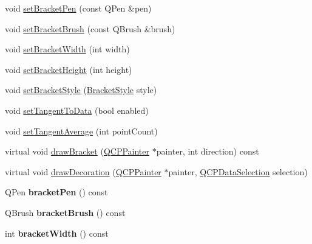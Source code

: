 \begin{DoxyCompactItemize}
\item 
void \hyperlink{class_q_c_p_selection_decorator_bracket_ac0e392a6097990f8aa978932a8fa05d6}{set\+Bracket\+Pen} (const Q\+Pen \&pen)
\item 
void \hyperlink{class_q_c_p_selection_decorator_bracket_a2f4ea0bfb0ea980252b76dd349dd53aa}{set\+Bracket\+Brush} (const Q\+Brush \&brush)
\item 
void \hyperlink{class_q_c_p_selection_decorator_bracket_a291b59cab98ce93a0a3c85963fe10f5e}{set\+Bracket\+Width} (int width)
\item 
void \hyperlink{class_q_c_p_selection_decorator_bracket_aed773ad737201cca40efc6fe451acad8}{set\+Bracket\+Height} (int height)
\item 
void \hyperlink{class_q_c_p_selection_decorator_bracket_a04507697438f6ad8cc2aeea5422dcbe5}{set\+Bracket\+Style} (\hyperlink{class_q_c_p_selection_decorator_bracket_aa6d18517ec0553575bbef0de4252336e}{Bracket\+Style} style)
\item 
void \hyperlink{class_q_c_p_selection_decorator_bracket_a93bc6086e53a5e40a08641a7b2e2cdd5}{set\+Tangent\+To\+Data} (bool enabled)
\item 
void \hyperlink{class_q_c_p_selection_decorator_bracket_adb2d0876f25a77c88042b70818f1d6e4}{set\+Tangent\+Average} (int point\+Count)
\item 
virtual void \hyperlink{class_q_c_p_selection_decorator_bracket_a8153966498e2a8d4c11c681e06d7d692}{draw\+Bracket} (\hyperlink{class_q_c_p_painter}{Q\+C\+P\+Painter} $\ast$painter, int direction) const 
\item 
virtual void \hyperlink{class_q_c_p_selection_decorator_bracket_a1ceb893063ea3d7197a24098018f4bfb}{draw\+Decoration} (\hyperlink{class_q_c_p_painter}{Q\+C\+P\+Painter} $\ast$painter, \hyperlink{class_q_c_p_data_selection}{Q\+C\+P\+Data\+Selection} selection)
\item 
Q\+Pen {\bfseries bracket\+Pen} () const \hypertarget{class_q_c_p_selection_decorator_bracket_a005e0b95ead06dee20898ea925b31474}{}\label{class_q_c_p_selection_decorator_bracket_a005e0b95ead06dee20898ea925b31474}

\item 
Q\+Brush {\bfseries bracket\+Brush} () const \hypertarget{class_q_c_p_selection_decorator_bracket_a09805c4d1db2c5d0fcaf22e9e1e25a7c}{}\label{class_q_c_p_selection_decorator_bracket_a09805c4d1db2c5d0fcaf22e9e1e25a7c}

\item 
int {\bfseries bracket\+Width} () const \hypertarget{class_q_c_p_selection_decorator_bracket_a96e958e7a9caf3eef7722790ebd60e4d}{}\label{class_q_c_p_selection_decorator_bracket_a96e958e7a9caf3eef7722790ebd60e4d}


\end{DoxyCompactItemize}
